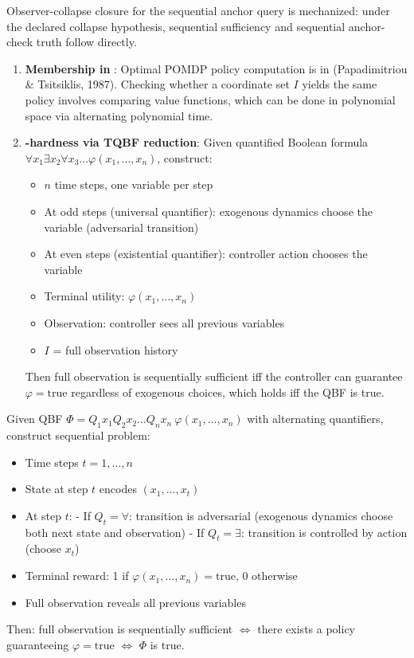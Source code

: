 
Observer-collapse closure for the sequential anchor query is mechanized: under the declared collapse hypothesis, sequential sufficiency and sequential anchor-check truth follow directly.

\begin{enumerate}
\item \textbf{Membership in \PSPACE}: Optimal POMDP policy computation is in \PSPACE (Papadimitriou \& Tsitsiklis, 1987). Checking whether a coordinate set $I$ yields the same policy involves comparing value functions, which can be done in polynomial space via alternating polynomial time.

\item \textbf{\PSPACE-hardness via TQBF reduction}: Given quantified Boolean formula $\forall x_1 \exists x_2 \forall x_3 \ldots \varphi(x_1, \ldots, x_n)$, construct:
\begin{itemize}
\item $n$ time steps, one variable per step
\item At odd steps (universal quantifier): exogenous dynamics choose the variable (adversarial transition)
\item At even steps (existential quantifier): controller action chooses the variable
\item Terminal utility: $\varphi(x_1, \ldots, x_n)$
\item Observation: controller sees all previous variables
\item $I$ = full observation history
\end{itemize}
Then full observation is sequentially sufficient iff the controller can guarantee $\varphi = \text{true}$ regardless of exogenous choices, which holds iff the QBF is true.
\end{enumerate}


\begin{construction}\label{constr:tqbf-to-sequential}
Given QBF $\Phi = Q_1 x_1 Q_2 x_2 \ldots Q_n x_n\ \varphi(x_1, \ldots, x_n)$ with alternating quantifiers, construct sequential problem:
\begin{itemize}
\item Time steps $t = 1, \ldots, n$
\item State at step $t$ encodes $(x_1, \ldots, x_t)$
\item At step $t$:
  - If $Q_t = \forall$: transition is adversarial (exogenous dynamics choose both next state and observation)
  - If $Q_t = \exists$: transition is controlled by action (choose $x_t$)
\item Terminal reward: 1 if $\varphi(x_1, \ldots, x_n) = \text{true}$, 0 otherwise
\item Full observation reveals all previous variables
\end{itemize}
Then: full observation is sequentially sufficient $\iff$ there exists a policy guaranteeing $\varphi = \text{true}$ $\iff$ $\Phi$ is true.
\end{construction}

